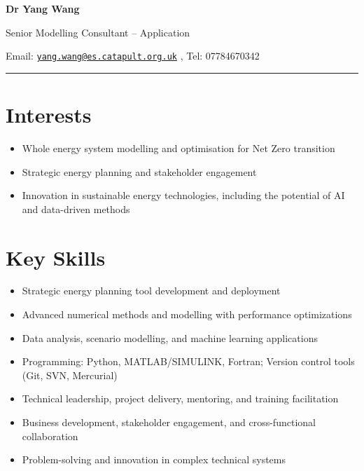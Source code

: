 \documentclass[letterpaper]{article}
\def\name{Dr Yang Wang}
\begin{document}

\centerline{\LARGE \bf Dr Yang Wang}
\vspace{0.05in}
\centerline{\large Senior Modelling Consultant – Application}

\begin{minipage}{\linewidth}
\begin{center}
Email: \href{mailto:yang.wang@es.catapult.org.uk}{\tt yang.wang@es.catapult.org.uk} , Tel: 07784670342 \\
\end{center}
\end{minipage}

\rule{\textwidth}{1pt}

\section*{Interests}
\begin{itemize}
\item Whole energy system modelling and optimisation for Net Zero transition
\item Strategic energy planning and stakeholder engagement
\item Innovation in sustainable energy technologies, including the potential of AI and data-driven methods
\end{itemize}

\section*{Key Skills}
\begin{itemize}
\item Strategic energy planning tool development and deployment
\item Advanced numerical methods and modelling with performance optimizations
\item Data analysis, scenario modelling, and machine learning applications
\item Programming: Python, MATLAB/SIMULINK, Fortran; Version control tools (Git, SVN, Mercurial)
\item Technical leadership, project delivery, mentoring, and training facilitation
\item Business development, stakeholder engagement, and cross-functional collaboration
\item Problem-solving and innovation in complex technical systems
\end{itemize}
\end{document}
